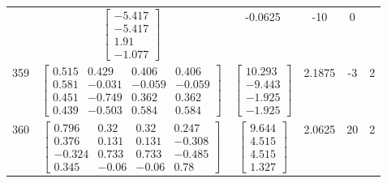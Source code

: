 \documentclass[a4paper,12pt]{article}
\begin{document}
\begin{tabular}{c c c c c c}
&
$\begin{bmatrix} -5.417 \\ -5.417 \\ 1.91 \\ -1.077 \end{bmatrix}$
&
-0.0625
&
-10
&
0
\\
359
&
$\begin{bmatrix} 0.515 & 0.429 & 0.406 & 0.406 \\ 0.581 & -0.031 & -0.059 & -0.059 \\ 0.451 & -0.749 & 0.362 & 0.362 \\ 0.439 & -0.503 & 0.584 & 0.584 \end{bmatrix}$
&
$\begin{bmatrix} 10.293 \\ -9.443 \\ -1.925 \\ -1.925 \end{bmatrix}$
&
2.1875
&
-3
&
2
\\
360
&
$\begin{bmatrix} 0.796 & 0.32 & 0.32 & 0.247 \\ 0.376 & 0.131 & 0.131 & -0.308 \\ -0.324 & 0.733 & 0.733 & -0.485 \\ 0.345 & -0.06 & -0.06 & 0.78 \end{bmatrix}$
&
$\begin{bmatrix} 9.644 \\ 4.515 \\ 4.515 \\ 1.327 \end{bmatrix}$
&
2.0625
&
20
&
2
\\
\end{tabular} \egroup \newpage
\end{document}
